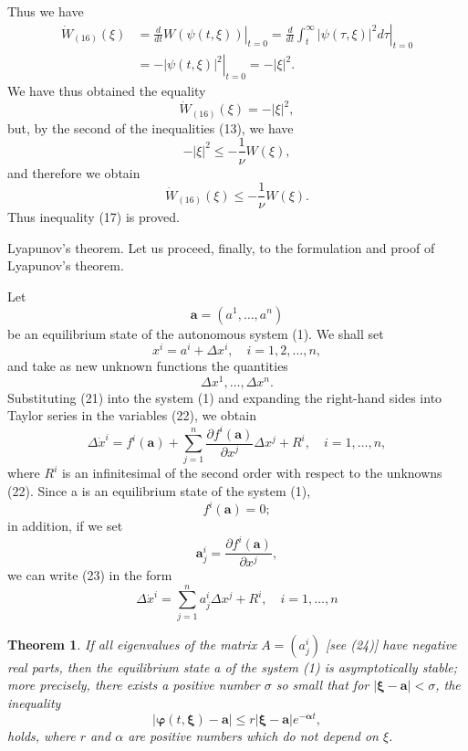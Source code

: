 \documentclass[10pt,a5paper]{book}
\theoremstyle{plain}
\newtheorem{theorem}{Theorem}
\theoremstyle{definition}
\theoremstyle{remark}
\begin{document}
Thus we have
\[
\begin{aligned}
\dot{W}_{(16)}(\xi) & =\left.\frac{d}{d t} W(\psi(t, \xi))\right|_{t=0}=\left.\frac{d}{d t} \int_{t}^{\infty}|\psi(\tau, \xi)|^{2} d \tau\right|_{t=0} \\
& =-\left.|\psi(t, \xi)|^{2}\right|_{t=0}=-|\xi|^{2} .
\end{aligned}
\]
We have thus obtained the equality
\[
\dot{W}_{(16)}(\xi)=-|\xi|^{2},
\]
but, by the second of the inequalities (13), we have
\[
-|\xi|^{2} \leq-\frac{1}{\nu} W(\xi),
\]
and therefore we obtain
\[
\dot{W}_{(16)}(\xi) \leq-\frac{1}{\nu} W(\xi) .
\]
Thus inequality (17) is proved.

Lyapunov's theorem. Let us proceed, finally, to the formulation and proof of Lyapunov's theorem.

Let
\[
\mathbf{a}=\left(a^{1}, \ldots, a^{n}\right)
\]
be an equilibrium state of the autonomous system (1). We shall set
\begin{equation*}
x^{i}=a^{i}+\Delta x^{i}, \quad i=1,2, \ldots, n, \tag{21}
\end{equation*}
and take as new unknown functions the quantities
\begin{equation*}
\Delta x^{1}, \ldots, \Delta x^{n} . \tag{22}
\end{equation*}
Substituting (21) into the system (1) and expanding the right-hand sides into Taylor series in the variables (22), we obtain
\begin{equation*}
\Delta \dot{x}^{i}=f^{i}(\mathbf{a})+\sum_{j=1}^{n} \frac{\partial f^{i}(\mathbf{a})}{\partial x^{j}} \Delta x^{j}+R^{i}, \quad i=1, \ldots, n, \tag{23}
\end{equation*}
where $R^{i}$ is an infinitesimal of the second order with respect to the unknowns (22). Since a is an equilibrium state of the system (1),
\[
f^{i}(\mathbf{a})=0 ;
\]
in addition, if we set
\begin{equation*}
\boldsymbol{a}_{j}^{i}=\frac{\partial f^{i}(\mathbf{a})}{\partial x^{j}}, \tag{24}
\end{equation*}
we can write (23) in the form
\begin{equation*}
\Delta \dot{x}^{i}=\sum_{j=1}^{n} a_{j}^{i} \Delta x^{j}+R^{i}, \quad i=1, \ldots, n \tag{25}
\end{equation*}

\begin{theorem}
If all eigenvalues of the matrix $A=\left(a_{j}^{i}\right)$ [see (24)] have negative real parts, then the equilibrium state a of the system (1) is asymptotically stable; more precisely, there exists a positive number $\sigma$ so small that for $|\boldsymbol{\xi}-\mathbf{a}|<\sigma$, the inequality
\begin{equation*}
|\boldsymbol{\varphi}(t, \boldsymbol{\xi})-\mathbf{a}| \leq r|\boldsymbol{\xi}-\mathbf{a}| e^{-\boldsymbol{\alpha} t}, \tag{26}
\end{equation*}
holds, where $r$ and $\alpha$ are positive numbers which do not depend on $\xi$.
\end{theorem}
\end{document}
